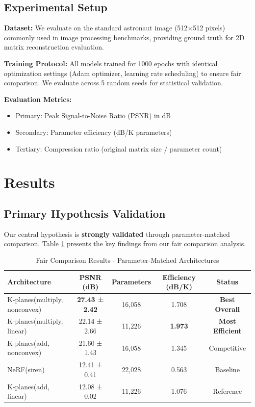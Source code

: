 \documentclass{article}
\begin{document}
\subsection{Experimental Setup}

\textbf{Dataset:} We evaluate on the standard astronaut image (512×512 pixels) commonly used in image processing benchmarks, providing ground truth for 2D matrix reconstruction evaluation.

\textbf{Training Protocol:} All models trained for 1000 epochs with identical optimization settings (Adam optimizer, learning rate scheduling) to ensure fair comparison. We evaluate across 5 random seeds for statistical validation.

\textbf{Evaluation Metrics:}
\begin{itemize}
\item Primary: Peak Signal-to-Noise Ratio (PSNR) in dB
\item Secondary: Parameter efficiency (dB/K parameters)  
\item Tertiary: Compression ratio (original matrix size / parameter count)
\end{itemize}

\section{Results}

\subsection{Primary Hypothesis Validation}

Our central hypothesis is \textbf{strongly validated} through parameter-matched comparison. Table \ref{tab:main_results} presents the key findings from our fair comparison analysis.

\begin{table}[h]
\centering
\caption{Fair Comparison Results - Parameter-Matched Architectures}
\label{tab:main_results}
\begin{tabular}{lcccc}
\toprule
\textbf{Architecture} & \textbf{PSNR (dB)} & \textbf{Parameters} & \textbf{Efficiency (dB/K)} & \textbf{Status} \\
\midrule
K-planes(multiply, nonconvex) & \textbf{27.43 ± 2.42} & 16,058 & 1.708 & \textbf{Best Overall} \\
K-planes(multiply, linear) & 22.14 ± 2.66 & 11,226 & \textbf{1.973} & \textbf{Most Efficient} \\
K-planes(add, nonconvex) & 21.60 ± 1.43 & 16,058 & 1.345 & Competitive \\
NeRF(siren) & 12.41 ± 0.41 & 22,028 & 0.563 & Baseline \\
K-planes(add, linear) & 12.08 ± 0.02 & 11,226 & 1.076 & Reference \\
\bottomrule
\end{tabular}
\end{table}
\end{document}
